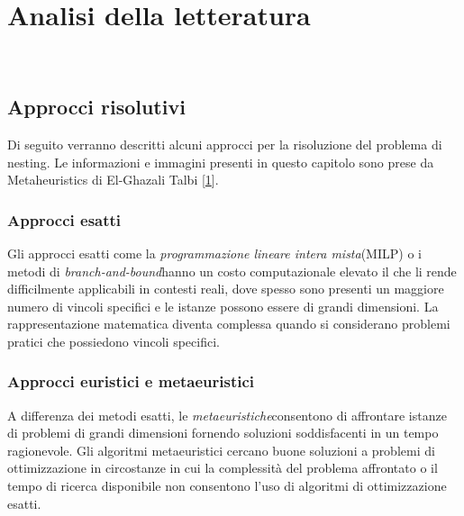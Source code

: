 \chapter{Analisi della letteratura}
\label{cap:descrizione-stage}

\\

\section{Approcci risolutivi} \hypertarget{metaeuristiche}{}

Di seguito verranno descritti alcuni approcci per la risoluzione del problema di nesting. Le informazioni e immagini presenti in questo capitolo sono prese da Metaheuristics di El-Ghazali Talbi [\hyperlink{bibliografia}{1}].

\subsection{Approcci esatti}

Gli approcci esatti come la \emph{programmazione lineare intera mista}\glsfirstoccur (MILP) o i metodi di \emph{branch-and-bound}\glsfirstoccur hanno un costo computazionale elevato il che li rende difficilmente applicabili in contesti reali, dove spesso sono presenti un maggiore numero di vincoli specifici e le istanze possono essere di grandi dimensioni. La rappresentazione matematica diventa complessa quando si considerano problemi pratici che possiedono vincoli specifici.

\subsection{Approcci euristici e metaeuristici} 

A differenza dei metodi esatti, le \emph{metaeuristiche}\glsfirstoccur consentono di affrontare istanze di problemi di grandi dimensioni fornendo soluzioni soddisfacenti in un tempo ragionevole. Gli algoritmi metaeuristici cercano buone soluzioni a problemi di ottimizzazione in circostanze in cui la complessità del problema affrontato o il tempo di ricerca disponibile non consentono l'uso di algoritmi di ottimizzazione esatti.

